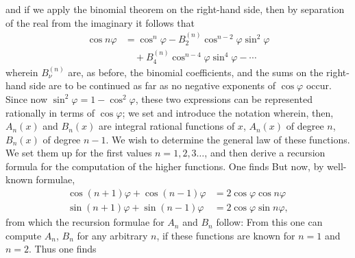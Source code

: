 and if we apply the binomial theorem on the right-hand side, then by separation of the real from the imaginary it follows that
\[
\begin{aligned}
\cos n\varphi &= \cos^n\varphi - B_2^{(n)}\cos^{n-2}\varphi\sin^2\varphi\\
&\quad + B_4^{(n)}\cos^{n-4}\varphi\sin^4\varphi - \cdots
\end{aligned}
\]
wherein $B_\nu^{(n)}$ are, as before, the binomial coefficients, and the sums on the right-hand side are to be continued as far as no negative exponents of $\cos\varphi$ occur. Since now $\sin^2\varphi = 1 - \cos^2\varphi$, these two expressions can be represented rationally in terms of $\cos\varphi$; we set
and introduce the notation
wherein, then, $A_n(x)$ and $B_n(x)$ are integral rational functions of $x$, $A_n(x)$ of degree $n$, $B_n(x)$ of degree $n-1$. We wish to determine the general law of these functions. We set them up for the first values $n = 1, 2, 3\ldots$, and then derive a recursion formula for the computation of the higher functions. One finds
But now, by well-known formulae,
\[
\begin{aligned}
\cos(n+1)\varphi + \cos(n-1)\varphi &= 2\cos\varphi\cos n\varphi\\
\sin(n+1)\varphi + \sin(n-1)\varphi &= 2\cos\varphi\sin n\varphi,
\end{aligned}
\]
from which the recursion formulae for $A_n$ and $B_n$ follow:
From this one can compute $A_n$, $B_n$ for any arbitrary $n$, if these functions are known for $n = 1$ and $n = 2$. Thus one finds

